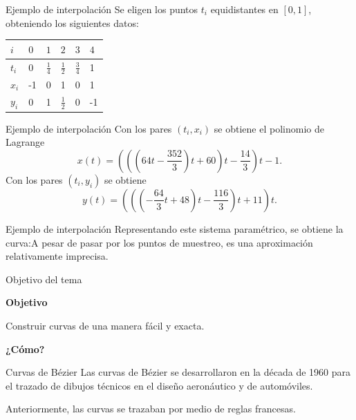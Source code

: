 \documentclass[main.tex]{subfiles}
\begin{document}
\begin{frame}[t]{Ejemplo de interpolación}
Se eligen los puntos $t_i$ equidistantes en $[0,1]$, obteniendo los siguientes datos:\begingroup\small\setlength{\tabcolsep}{2pt}\begin{center}\begin{tabular}{|C{.14\textwidth}|C{.14\textwidth}|C{.14\textwidth}|C{.14\textwidth}|C{.14\textwidth}|C{.14\textwidth}|}\hline
$i$ & $0$ & $1$ & $2$ & $3$ & $4$\\\hline
\rule[-1.5mm]{0pt}{5mm}$t_i$ & 0 & $\frac14$ & $\frac12$ & $\frac34$ & 1\\\hline
\rule[-1.5mm]{0pt}{5mm}$x_i$ & -1 & 0 & 1 & 0 & 1\\\hline
\rule[-1.5mm]{0pt}{5mm}$y_i$ & 0 & 1 & $\frac12$ & 0 & -1\\\hline
\end{tabular}\end{center}\endgroup{}
\end{frame}

\begin{frame}[t]{Ejemplo de interpolación}
Con los pares $(t_i,x_i)$ se obtiene el polinomio de Lagrange\[x(t)=\left(\left(\left(64t-\frac{352}{3}\right)t+60\right)t-\frac{14}{3}\right)t-1.\]\medskip Con los pares $(t_i,y_i)$ se obtiene\[y(t)=\left(\left(\left(-\frac{64}{3}t+48\right)t-\frac{116}{3}\right)t+11\right)t.\]
\end{frame}

\begin{frame}[t]{Ejemplo de interpolación}
Representando este sistema paramétrico, se obtiene la curva:A pesar de pasar por los puntos de muestreo, es una aproximación relativamente imprecisa.
\end{frame}

\begin{frame}[t]{Objetivo del tema}
\vfill\begin{center}\Large\textbf{Objetivo}\par\bigskip Construir curvas de una manera fácil y exacta.\par\bigskip\textbf{¿Cómo?}\end{center}\vfill
\end{frame}

\begin{frame}[t]{Curvas de Bézier}
Las curvas de Bézier se desarrollaron en la década de 1960 para el trazado de dibujos técnicos en el diseño aeronáutico y de automóviles.\par\medskip Anteriormente, las curvas se trazaban por medio de reglas francesas.
\end{frame}
\end{document}
